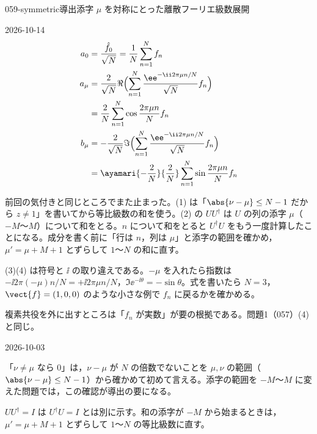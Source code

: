 \documentclass[uplatex,dvipdfmx,a4paper,11pt]{jsarticle}
\begin{document}
\begin{mondai}{059-symmetric}{導出}{添字 $\mu$ を対称にとった離散フーリエ級数展開}
\begin{kotaeutsushi}{2026-10-14}
\begin{align*}
  a_0&=\frac{\hat{f}_0}{\sqrt{N}}=\frac{1}{N}\sum_{n=1}^{N}f_n\\
  a_{\mu}&=\frac{2}{\sqrt{N}}\Re\Bigl(\sum_{n=1}^{N}\frac{\ee^{-\ii2\pi\mu n/N}}{\sqrt{N}}f_n\Bigr)\\
  &=\frac{2}{N}\sum_{n=1}^{N}\cos\frac{2\pi\mu n}{N}f_n\\
  b_{\mu}&=-\frac{2}{\sqrt{N}}\Im\Bigl(\sum_{n=1}^{N}\frac{\ee^{-\ii2\pi\mu n/N}}{\sqrt{N}}f_n\Bigr)\\
  &=\ayamari{-\frac{2}{N}}{\frac{2}{N}}\sum_{n=1}^{N}\sin\frac{2\pi\mu n}{N}f_n
\end{align*}
\end{kotaeutsushi}
\begin{kizuki}
\item {} 前回の気付きと同じところでまた止まった。(1) は「$\abs{\nu-\mu}\le N-1$ だから $z\neq1$」を書いてから等比級数の和を使う。(2) の $UU^{\dagger}$ は $U$ の列の添字 $\mu$（$-M$〜$M$）について和をとる。$n$ について和をとると $U^{\dagger}U$ をもう一度計算したことになる。成分を書く前に「行は $n$，列は $\mu$」と添字の範囲を確かめ，$\mu'=\mu+M+1$ とずらして $1$〜$N$ の和に直す。
\item (3)(4) は符号と $\ii$ の取り違えである。$-\mu$ を入れたら指数は $-\ii2\pi(-\mu)n/N=+\ii2\pi\mu n/N$，$\Im\ee^{-\ii\theta}=-\sin\theta$。式を書いたら $N=3$，$\vect{f}=(1,0,0)$ のような小さな例で $f_n$ に戻るかを確かめる。
\item 複素共役を外に出すところは「$f_n$ が実数」が要の根拠である。問題1（057）(4) と同じ。
\end{kizuki}
\begin{maekizuki}{2026-10-03}
\item 「$\nu\neq\mu$ なら 0」は，$\nu-\mu$ が $N$ の倍数でないことを $\mu,\nu$ の範囲（$\abs{\nu-\mu}\le N-1$）から確かめて初めて言える。添字の範囲を $-M$〜$M$ に変えた問題では，この確認が導出の要になる。
\item $UU^{\dagger}=I$ は $U^{\dagger}U=I$ とは別に示す。和の添字が $-M$ から始まるときは，$\mu'=\mu+M+1$ とずらして $1$〜$N$ の等比級数に直す。

\end{maekizuki}
\end{mondai}
\end{document}
